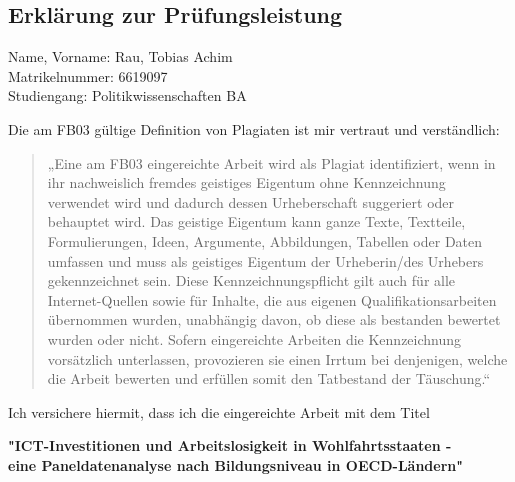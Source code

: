 \newpage



\subsection{Erklärung zur Prüfungsleistung}

{\footnotesize

    Name, Vorname: Rau, Tobias Achim \\
    Matrikelnummer: 6619097 \\
    Studiengang: Politikwissenschaften BA

    \vspace{0.5cm}

    Die am FB03 gültige Definition von Plagiaten ist mir vertraut und verständlich: 

    \begin{quote}
        „Eine am FB03 eingereichte Arbeit wird als Plagiat identifiziert, wenn in ihr nachweislich 
        fremdes geistiges Eigentum ohne Kennzeichnung verwendet wird und dadurch dessen Urheberschaft 
        suggeriert oder behauptet wird. Das geistige Eigentum kann ganze Texte, Textteile, 
        Formulierungen, Ideen, Argumente, Abbildungen, Tabellen oder Daten umfassen und muss als 
        geistiges Eigentum der Urheberin/des Urhebers gekennzeichnet sein. Diese 
        Kennzeichnungspflicht gilt auch für alle Internet-Quellen sowie für Inhalte, die aus eigenen 
        Qualifikationsarbeiten übernommen wurden, unabhängig davon, ob diese als bestanden bewertet 
        wurden oder nicht. Sofern eingereichte Arbeiten die Kennzeichnung vorsätzlich unterlassen, 
        provozieren sie einen Irrtum bei denjenigen, welche die Arbeit bewerten und erfüllen somit 
        den Tatbestand der Täuschung.“  
    \end{quote}

    Ich versichere hiermit, dass ich die eingereichte Arbeit mit dem Titel 

    \begin{center}
        \textbf{"\ac{ICT}-Investitionen und Arbeitslosigkeit in Wohlfahrtsstaaten - \\ 
        eine Paneldatenanalyse nach Bildungsniveau in OECD-Ländern"} \\ 
    \end{center}

}
